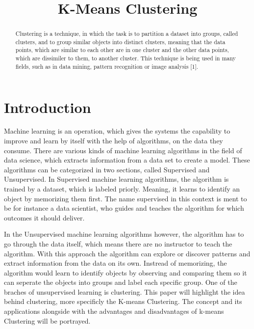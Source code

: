 \documentclass[conference]{IEEEtran}
\begin{document}
\title{K-Means Clustering\\
}

\author{

}

\maketitle

\begin{abstract}
Clustering is a technique, in which the task is to partition a dataset into groups, called clusters, and to group similar objects into distinct clusters, meaning that the data points, which are similar to each other are in one cluster and the other data points, which are dissimiler to them, to another cluster. This technique is being used in many fields, such as in data mining, pattern recognition or image analysis [1].
\end{abstract}

\begin{IEEEkeywords}

\end{IEEEkeywords}

\section{Introduction}
Machine learning is an operation, which gives the systems the capability to improve and learn by itself with the help of algorithms, on the data they consume. There are various kinds of machine learning algorithms in the field of data science, which extracts information from a data set to create a model. These algorithms can be categorized in two sections, called Supervised and Unsupervised. In Supervised machine learning algorithms, the algorithm is trained by a dataset, which is labeled priorly. Meaning, it learns to identify an object by memorizing them first. The name supervised in this context is ment to be for instance a data scientist, who guides and teaches the algorithm for which outcomes it should deliver.

In the Unsupervised machine learning algorithms however, the algorithm has to go through the data itself, which means there are no instructor to teach the algorithm. With this approach the algorithm can explore or discover patterns and extract information from the data on its own. Instread of memorizing, the algorithm would learn to identify objects by observing and comparing them so it can seperate the objects into groups and label each specific group. One of the braches of unsupervised learning is clustering. This paper will highlight the idea behind clustering, more specificly the K-means Clustering. The concept and its applications alongside with the advantages and disadvantages of k-means Clustering will be portrayed.
\end{document}
